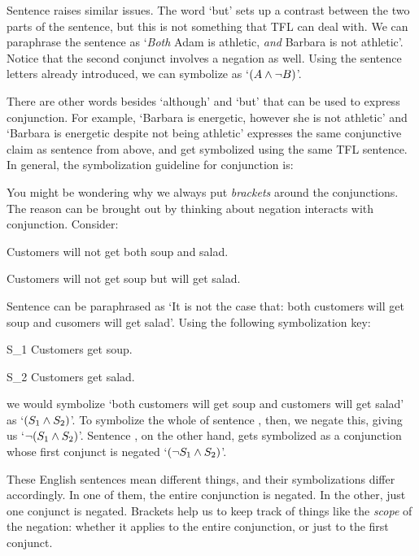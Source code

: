 Sentence  raises similar issues. The word `but' sets up a contrast between the two parts of the sentence, but this is not something that TFL can deal with. We can paraphrase the sentence as `\emph{Both} Adam is athletic, \emph{and} Barbara is not athletic'.  Notice that the second conjunct involves a negation as well.  Using the sentence letters already introduced, we can symbolize  as `$(A \wedge \neg B)$'.


There are other words besides `although' and `but' that can be used to express conjunction.  For example, `Barbara is energetic, however she is not athletic' and `Barbara is energetic despite not being athletic' expresses the same conjunctive claim as sentence  from above, and get symbolized using the same TFL sentence. In general, the symbolization guideline for conjunction is:


You might be wondering why we always put \emph{brackets} around the conjunctions. The reason can be brought out by thinking about negation interacts with conjunction. Consider:

	\begin{earg}
		\item[\ex{negcon1}] Customers will not get both soup and salad.
		\item[\ex{negcon2}] Customers will not get soup but  will get salad.
	\end{earg}

Sentence  can be paraphrased as `It is not the case that: both customers will get soup and cusomers will get salad'. Using the following symbolization key:
	\begin{ekey}
		\item[S_1] Customers get soup.
		\item[S_2] Customers get salad.
	\end{ekey}
we would symbolize `both customers will get soup and customers will get salad' as `$(S_1 \wedge S_2)$'. To symbolize the whole of sentence , then, we negate this, giving us `$\neg (S_1 \wedge S_2)$'. Sentence , on the other hand, gets symbolized as a conjunction whose first conjunct is negated `$(\neg S_1 \wedge S_2)$'.

These English sentences mean different things, and their symbolizations differ accordingly. In one of them, the entire conjunction is negated. In the other, just one conjunct is negated. Brackets help us to keep track of things like the \emph{scope} of the negation: whether it applies to the entire conjunction, or just to the first conjunct.


